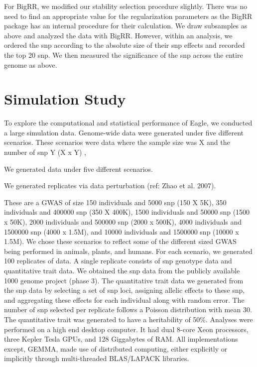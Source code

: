 \documentclass{nature}
\begin{document}
For BigRR, we modified our stability selection procedure slightly. 
There was no need to find an appropriate value for the regularization 
parameters as the BigRR package has an internal procedure for their 
calculation. We draw subsamples as above and analyzed the data with BigRR. However, within an analysis, we ordered 
the snp according to the absolute size of their snp effects and recorded the top 20 snp. We then measured the significance 
of the snp across the entire genome as above. 


\cite{meinshausen2010stability}


\section{Simulation Study}

To explore the computational and statistical performance of Eagle, we conducted a large simulation data.  Genome-wide data 
were generated under five different scenarios. These scenarios were data where the sample size was X and the number of snp Y (X x Y) ,

We generated data under five different scenarios. 


We generated 
replicates via data perturbation (ref: Zhao et al. 2007).


These are a GWAS of size 150 individuals and 5000 snp (150 X 5K), 350 individuals and 400000 snp (350 X 400K),  1500 individuals and 
50000 snp (1500 x 50K), 2000 individuals and 500000 snp (2000 x 500K), 4000 individuals and 
1500000 snp (4000 x 1.5M), and 10000 individuals and 1500000 snp (10000 x 1.5M).  
We chose these scenarios to reflect some of the different sized GWAS being performed in animals, plants, and humans. 
For each scenario, we generated 100 replicates of data. A single replicate consists of snp genotype data and quantitative trait data. 
We obtained the snp data from the publicly available 1000 genome project (phase 3). The quantitative trait data we generated from the 
snp data by selecting a set of snp loci, assigning allelic effects to these snp, and aggregating these effects for each individual along with 
random error. The number of snp selected per replicate follows a Poisson distribution with mean 30.
 The quantitative trait was generated to have a heritability of 50\%.
Analyses were performed on a high end desktop computer. It had dual 8-core Xeon processors, three Kepler Tesla GPUs, and 128 Giggabytes of RAM. All implementations except, GEMMA, made use of distributed computing, either explicitly or implicitly through multi-threaded BLAS/LAPACK libraries. 
\end{document}
